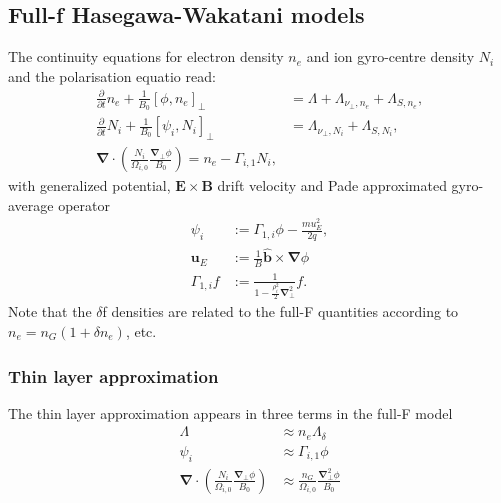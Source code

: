 \documentclass{hitec} %
\renewcommand{\vec}[1]{\boldsymbol{#1}}
\begin{document}
\subsection{Full-f Hasegawa-Wakatani models}
The continuity equations for electron density \(n_e\) and ion gyro-centre density \(N_i\) and the polarisation equatio read:
\begin{align}
 \frac{\partial}{\partial t }n_e  + \frac{1}{B_0} \left[\phi, n_e\right]_{\perp} &=\Lambda + \Lambda_{\nu_\perp, n_e} +  \Lambda_{S, n_e}
,\\
\frac{\partial}{\partial t } N_i+\frac{1}{B_0} \left[\psi_i, N_i\right]_{\perp} &=\Lambda_{\nu_\perp, N_i} + \Lambda_{S, N_i} , \\
 \vec{\nabla} \cdot \left(\frac{N_i}{\Omega_{i,0}} \frac{\vec{\nabla}_\perp \phi}{B_0}\right)= n_e - \Gamma_{i,1} N_i, 
 \end{align}
with generalized potential, \(\vec{E} \times \vec{B}\) drift velocity and Pade approximated gyro-average operator
\begin{align}
  \psi_i&:= \Gamma_{1,i} \phi - \frac{m u_E^2}{2 q}, \\
  \vec{u}_E &:= \frac{1}{B} \vec{\hat{b}} \times \vec{\nabla} \phi \\
  \Gamma_{1,i} f&:= \frac{1}{1-\frac{\rho_i^2}{2}\vec{\nabla}_\perp^2} f. 
\end{align}
Note that the \(\delta\)f densities are related to the full-F quantities according to \(n_e = n_G (1+\delta n_e)\), etc.
\subsubsection{Thin layer approximation}
The thin layer approximation appears in three terms in the full-F model
\begin{align}
 \Lambda &\approx n_e \Lambda_\delta \\ 
 \psi_i &\approx \Gamma_{i,1}\phi \\
 \vec{\nabla} \cdot \left(\frac{N_i}{\Omega_{i,0}} \frac{\vec{\nabla}_\perp \phi}{B_0}\right) &\approx   \frac{n_G}{\Omega_{i,0}} \frac{\vec{\nabla}_\perp^2 \phi}{B_0}
\end{align}
\end{document}
